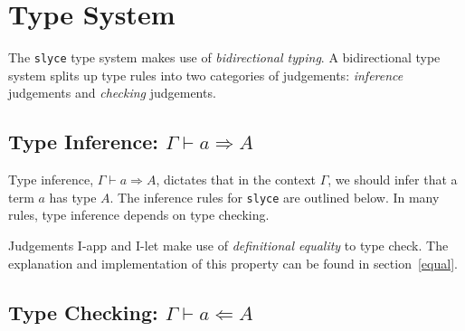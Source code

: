 \section{Type System}
The \texttt{slyce} type system makes use of \emph{bidirectional typing}. 
A bidirectional type system splits up type rules into two categories of judgements: \emph{inference} judgements and \emph{checking} judgements.
\subsection{Type Inference: $\Gamma\vdash a \Rightarrow A$}
Type inference, $\Gamma\vdash a \Rightarrow A$\footnotemark, dictates that in the context $\Gamma$, we should infer that a term $a$ has type $A$.
The inference rules for \texttt{slyce} are outlined below.
In many rules, type inference depends on type checking.



Judgements I-app and I-let make use of \emph{definitional equality} to type check. The explanation and implementation of this property can be found in section~\ref{equal}.

\subsection{Type Checking: $\Gamma\vdash a \Leftarrow A$}




